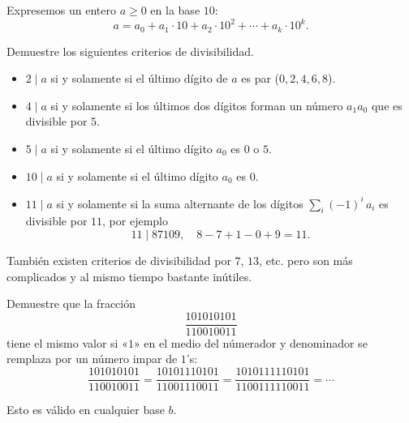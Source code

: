 \begin{ejercicio}
  \label{ejerc:criterios-de-divisibilidad}
  Expresemos un entero $a \ge 0$ en la base $10$:
  $$a = a_0 + a_1\cdot 10 + a_2\cdot 10^2 + \cdots + a_k\cdot 10^k.$$

  Demuestre los siguientes criterios de divisibilidad.

  \begin{itemize}
  \item $2\mid a$ si y solamente si el último dígito de $a$ es par
    ($0, 2, 4, 6, 8$).

  \item $4\mid a$ si y solamente si los últimos dos dígitos forman un número
    $a_1 a_0$ que es divisible por $5$.

  \item $5\mid a$ si y solamente si el último dígito $a_0$ es $0$ o $5$.

  \item $10\mid a$ si y solamente si el último dígito $a_0$ es $0$.

  \item $11\mid a$ si y solamente si la suma alternante de los dígitos
    $\sum_i (-1)^i\,a_i$ es divisible por $11$, por ejemplo
    \[ 11\mid 87109, \quad 8 - 7 + 1 - 0 + 9 = 11. \]
  \end{itemize}
\end{ejercicio}

También existen criterios de divisibilidad por $7$, $13$, etc. pero son más
complicados y al mismo tiempo bastante inútiles.

\begin{ejercicio}[N.\,Anning]
  Demuestre que la fracción
  $$\frac{101010101}{110010011}$$
  tiene el mismo valor si «$1$» en el medio del númerador y denominador se
  remplaza por un número impar de $1$'s:
  \[
    \frac{101010101}{110010011} =
    \frac{10101110101}{11001110011} =
    \frac{1010111110101}{1100111110011} = \cdots
  \]

  Esto es válido en cualquier base $b$.
\end{ejercicio}
